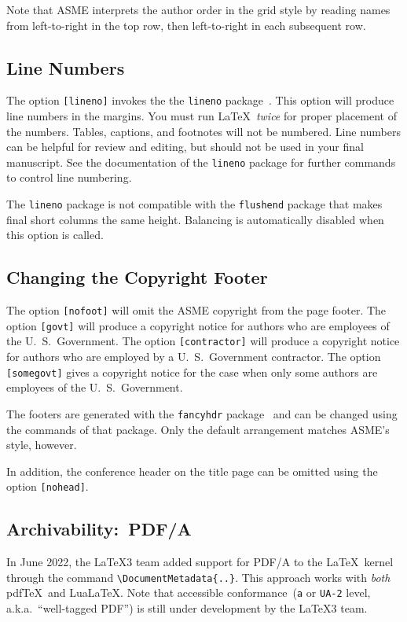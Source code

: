 \documentclass[colorlinks,upint,subscriptcorrection,varvw,hyphenate,balance,greek,russian,vietnamese,german]{asmeconf} %
\newcommand*\pdfTeX{pdf\TeX}
\newcommand*\LuaLaTeX{Lua\LaTeX}
\begin{document}
Note that ASME interprets the author order in the grid style by reading names from left-to-right in the top row, then left-to-right in each subsequent row.

\subsection{Line Numbers} The option \texttt{[lineno]} invokes the the \texttt{lineno} package~\cite{bottcher}. This option will produce line numbers in the margins. You must run \LaTeX\ \emph{twice} for proper placement of the numbers. Tables, captions, and footnotes will not be numbered.  Line numbers can be helpful for review and editing, but should not be used in your final manuscript. See the documentation of the \texttt{lineno} package for further commands to control line numbering. 

The \texttt{lineno} package is not compatible with the \texttt{flushend} package that makes final short columns the same height. Balancing is automatically disabled when this option is called. 

\subsection{Changing the Copyright Footer} The option \texttt{[nofoot]} will omit the ASME copyright from the page footer. The option \texttt{[govt]} will produce a copyright notice for authors who are employees of the U.\ S.\ Government.  
The option \texttt{[contractor]} will produce a copyright
notice for authors who are employed by a U.\ S.\ Government contractor.
The option \texttt{[somegovt]} gives a copyright notice for the case when only some authors are employees of the U.\ S.\ Government.

The footers are generated with the \texttt{fancyhdr} package~\cite{oostrum} and can be changed using the commands of that package. Only the default arrangement matches ASME's style, however.

In addition, the conference header on the title page can be omitted using the option \texttt{[nohead]}.

\subsection{Archivability:~PDF/A} In June 2022, the \LaTeX{}3 team added support for PDF/A to the \LaTeX\ kernel through the command \verb|\DocumentMetadata{..}|. This approach works with \emph{both} \pdfTeX\  and \LuaLaTeX. Note that accessible  conformance~(\texttt{a} or \texttt{UA-2} level, a.k.a.\ ``well-tagged PDF'') is still under development by the  \LaTeX3 team.
\end{document}
